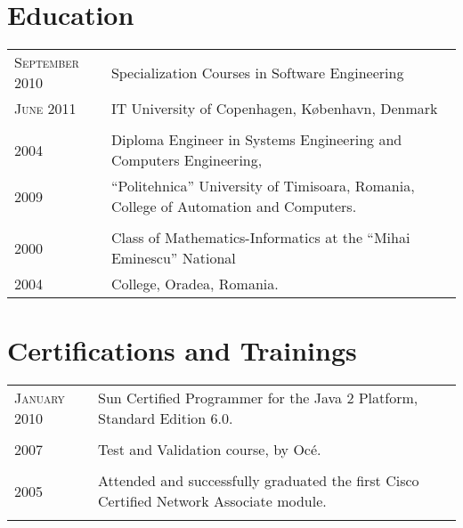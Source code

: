 \documentclass[a4paper,10pt]{article}
\begin{document}
\section{Education}
\begin{tabular}{p{2.5cm}|p{11cm}}
\raggedleft \textsc{September 2010} & Specialization Courses in Software Engineering\\
\raggedleft \textsc{June 2011} & IT University of Copenhagen, København,
Denmark \\ \multicolumn{2}{c}{} \\
\raggedleft \textsc{2004} & Diploma Engineer in Systems Engineering and
Computers Engineering, \\ \raggedleft \textsc{2009} & ``Politehnica'' University of Timisoara, Romania, College of Automation and
Computers.
\\\multicolumn{2}{c}{} \\ \raggedleft \textsc{2000} & Class of Mathematics-Informatics at the
``Mihai Eminescu'' National \\ \raggedleft \textsc{2004} &
College, Oradea, Romania.\\
\end{tabular}

\section{Certifications and Trainings}
\begin{tabular}{p{2.5cm}|p{11cm}}
\raggedleft \textsc{January 2010} & Sun Certified Programmer for the Java 2
Platform, Standard Edition 6.0. 
\\
\multicolumn{2}{c}{}
\\
 \raggedleft \textsc{2007} & Test and Validation course, by Oc\'e.\\
\multicolumn{2}{c}{} 
\\ 
\raggedleft  \textsc{2005} & Attended and successfully
graduated the first Cisco Certified Network Associate module.\\ \multicolumn{2}{c}{} \\
\end{tabular}

\end{document}

